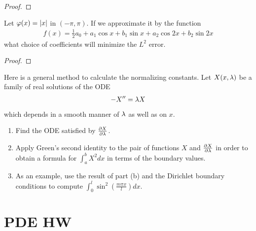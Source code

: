 \documentclass{report}
\begin{document}
\begin{proof}

\end{proof}
\begin{question}{}{}
Let $\varphi (x)=\left|x\right|$ in $(-\pi ,\pi )$. If we approximate it by the function 
\begin{align*}
f(x)= \frac{1}{2}a_0+ a_1\cos x + b_1 \sin x+ a_2 \cos 2x + b_2 \sin 2x
\end{align*}
what choice of coefficients will minimize the $L^2$ error. 
\end{question}
\begin{proof}

\end{proof}
\begin{question}{}{}
Here is a general method to calculate the normalizing constants. Let $X(x,\lambda )$ be a family of real solutions of the ODE 
\begin{align*}
-X''=\lambda  X
\end{align*}
which depends in a smooth manner of $\lambda $ as well as on $x$. 
 \begin{enumerate}[label=(\alph*)]
  \item Find the ODE satisfied by  $\frac{\partial X}{\partial \lambda }$.
  \item Apply Green's second identity to the pair of functions $X$ and  $\frac{\partial X}{\partial \lambda }$ in order to obtain a formula for $\int _a^b X^2 dx$ in terms of the boundary values. 
  \item As an example, use the result of part (b) and the Dirichlet boundary conditions to compute  $\int _0^l \sin^2 (\frac{m \pi  x}{l})dx$. 
\end{enumerate}
\end{question}
\chapter{PDE HW}
\end{document}
